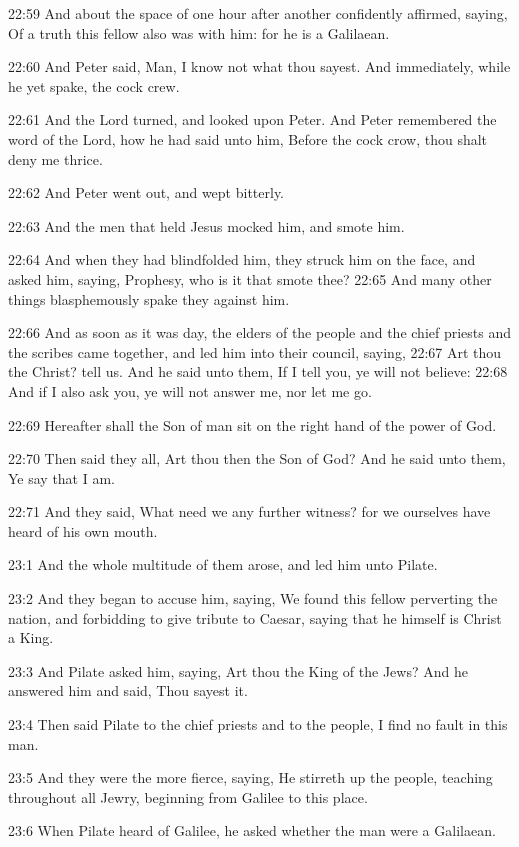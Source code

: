 22:59 And about the space of one hour after another confidently
affirmed, saying, Of a truth this fellow also was with him: for he is
a Galilaean.

22:60 And Peter said, Man, I know not what thou sayest. And
immediately, while he yet spake, the cock crew.

22:61 And the Lord turned, and looked upon Peter. And Peter remembered
the word of the Lord, how he had said unto him, Before the cock crow,
thou shalt deny me thrice.

22:62 And Peter went out, and wept bitterly.

22:63 And the men that held Jesus mocked him, and smote him.

22:64 And when they had blindfolded him, they struck him on the face,
and asked him, saying, Prophesy, who is it that smote thee?  22:65 And
many other things blasphemously spake they against him.

22:66 And as soon as it was day, the elders of the people and the
chief priests and the scribes came together, and led him into their
council, saying, 22:67 Art thou the Christ? tell us. And he said unto
them, If I tell you, ye will not believe: 22:68 And if I also ask you,
ye will not answer me, nor let me go.

22:69 Hereafter shall the Son of man sit on the right hand of the
power of God.

22:70 Then said they all, Art thou then the Son of God? And he said
unto them, Ye say that I am.

22:71 And they said, What need we any further witness? for we
ourselves have heard of his own mouth.

23:1 And the whole multitude of them arose, and led him unto Pilate.

23:2 And they began to accuse him, saying, We found this fellow
perverting the nation, and forbidding to give tribute to Caesar,
saying that he himself is Christ a King.

23:3 And Pilate asked him, saying, Art thou the King of the Jews? And
he answered him and said, Thou sayest it.

23:4 Then said Pilate to the chief priests and to the people, I find
no fault in this man.

23:5 And they were the more fierce, saying, He stirreth up the people,
teaching throughout all Jewry, beginning from Galilee to this place.

23:6 When Pilate heard of Galilee, he asked whether the man were a
Galilaean.

